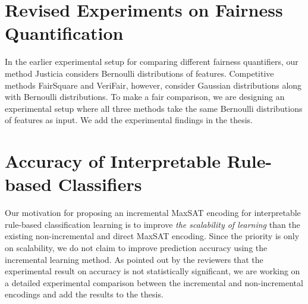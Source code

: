 \documentclass[10pt]{article}
\begin{document}
	
	
	\section*{Revised Experiments on Fairness Quantification} In the earlier experimental setup for comparing different fairness quantifiers, our method Justicia considers Bernoulli distributions of features. Competitive methods FairSquare and VeriFair, however, consider Gaussian distributions along with Bernoulli distributions. To make a fair comparison, we are designing an experimental setup where all three methods take the same Bernoulli distributions of features as input. We add the experimental findings in the thesis.
	
	\section*{Accuracy of  Interpretable Rule-based Classifiers} Our motivation for proposing an incremental MaxSAT encoding for interpretable rule-based classification learning is to improve \emph{the scalability of learning} than the existing non-incremental and direct MaxSAT encoding. Since the priority is only on scalability, we do not claim to improve prediction accuracy using the incremental learning method. As pointed out by the reviewers that the experimental result on accuracy is not statistically significant, we are working on a detailed experimental comparison between the incremental and non-incremental encodings and add the results to the thesis.
\end{document}
